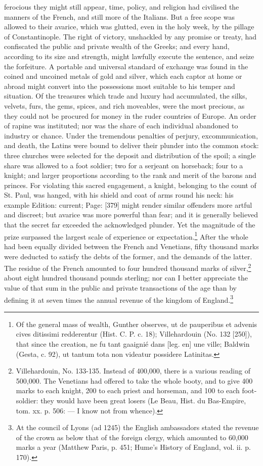 ferocious they might still appear, time, policy, and religion had civilised the manners of the French, and still more of the Italians. But a free scope was allowed to their avarice, which was glutted, even in the holy week, by the pillage of Constantinople. The right of victory, unshackled by any promise or treaty, had confiscated the public and private wealth of the Greeks; and every hand, according to its size and strength, might lawfully execute the sentence, and seize the forfeiture. A portable and universal standard of exchange was found in the coined and uncoined metals of gold and silver, which each captor at home or abroad might convert into the possessions most suitable to his temper and situation. Of the treasures which trade and luxury had accumulated, the silks, velvets, furs, the gems, spices, and rich moveables, were the most precious, as they could not be procured for money in the ruder countries of Europe. An order of rapine was instituted; nor was the share of each individual abandoned to industry or chance. Under the tremendous penalties of perjury, excommunication, and death, the Latins were bound to deliver their plunder into the common stock: three churches were selected for the deposit and distribution of the spoil; a single share was allowed to a foot soldier; two for a serjeant on horseback; four to a knight; and larger proportions according to the rank and merit of the barons and princes. For violating this sacred engagement, a knight, belonging to the count of St. Paul, was hanged, with his shield and coat of arms round his neck: his example Edition: current; Page: [379] might render similar offenders more artful and discreet; but avarice was more powerful than fear; and it is generally believed that the secret far exceeded the acknowledged plunder. Yet the magnitude of the prize surpassed the largest scale of experience or expectation.\footnote{Of the general mass of wealth, Gunther observes, ut de pauperibus et advenis cives ditissimi redderentur (Hist. C. P. c. 18); Villehardouin (No. 132 [250]), that since the creation, ne fu tant gaaignié dans [leg. en] une ville; Baldwin (Gesta, c. 92), ut tantum tota non videatur possidere Latinitas.} After the whole had been equally divided between the French and Venetians, fifty thousand marks were deducted to satisfy the debts of the former, and the demands of the latter. The residue of the French amounted to four hundred thousand marks of silver,\footnote{Villehardouin, No. 133-135. Instead of 400,000, there is a various reading of 500,000. The Venetians had offered to take the whole booty, and to give 400 marks to each knight, 200 to each priest and horseman, and 100 to each foot-soldier: they would have been great losers (Le Beau, Hist. du Bas-Empire, tom. xx. p. 506: \texthebrew{—} I know not from whence).} about eight hundred thousand pounds sterling; nor can I better appreciate the value of that sum in the public and private transactions of the age than by defining it at seven times the annual revenue of the kingdom of England.\footnote{At the council of Lyons (ad 1245) the English ambassadors stated the revenue of the crown as below that of the foreign clergy, which amounted to 60,000 marks a year (Matthew Paris, p. 451; Hume\texthebrew{}’s History of England, vol. ii. p. 170).}


